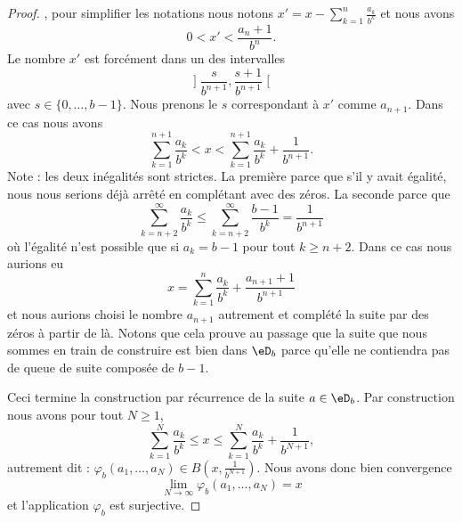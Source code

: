\begin{proof}
        , pour simplifier les notations nous notons \( x'=x-\sum_{k=1}^{n}\frac{ a_k }{ b^k }\) et nous avons
        \begin{equation}
            0<x'<\frac{ a_n+1 }{ b^n }.
        \end{equation}
        Le nombre \( x'\) est forcément dans un des intervalles
        \begin{equation}
                \mathopen] \frac{ s }{ b^{n+1} } , \frac{ s+1 }{ b^{n+1} } \mathclose[
        \end{equation}
        avec \( s\in\{ 0,\ldots, b-1 \}\). Nous prenons le \( s\) correspondant à \( x'\) comme \( a_{n+1}\). Dans ce cas nous avons
        \begin{equation}
            \sum_{k=1}^{n+1}\frac{ a_k }{ b^k }< x<\sum_{k=1}^{n+1}\frac{ a_k }{ b^k }+\frac{1}{ b^{n+1} }.
        \end{equation}
        Note : les deux inégalités sont strictes. La première parce que s'il y avait égalité, nous nous serions déjà arrêté en complétant avec des zéros. La seconde parce que
        \begin{equation}
            \sum_{k=n+2}^{\infty}\frac{ a_k }{ b^k }\leq \sum_{k=n+2}^{\infty}\frac{ b-1 }{ b^k }=\frac{1}{ b^{n+1} }
        \end{equation}
        où l'égalité n'est possible que si \( a_k=b-1\) pour tout \( k\geq n+2\). Dans ce cas nous aurions eu
        \begin{equation}
            x=\sum_{k=1}^{n}\frac{ a_k }{ b^k }+\frac{ a_{n+1}+1 }{ b^{n+1} }
        \end{equation}
        et nous aurions choisi le nombre \( a_{n+1}\) autrement et complété la suite par des zéros à partir de là. Notons que cela prouve au passage que la suite que nous sommes en train de construire est bien dans \( \eD_b\) parce qu'elle ne contiendra pas de queue de suite composée de \( b-1\).

        Ceci termine la construction par récurrence de la suite \( a\in \eD_b\). Par construction nous avons pour tout \( N\geq 1\),
        \begin{equation}
            \sum_{k=1}^N\frac{ a_k }{ b^k }\leq x\leq \sum_{k=1}^N\frac{ a_k }{ b^k }+\frac{1}{ b^{N+1} },
        \end{equation}
        autrement dit : \( \varphi_b(a_1,\ldots, a_N)\in B(x,\frac{1}{ b^{N+1} })\). Nous avons donc bien convergence
        \begin{equation}
            \lim_{N\to \infty} \varphi_b(a_1,\ldots, a_N)=x
        \end{equation}
        et l'application \( \varphi_b\) est surjective.
\end{proof}

